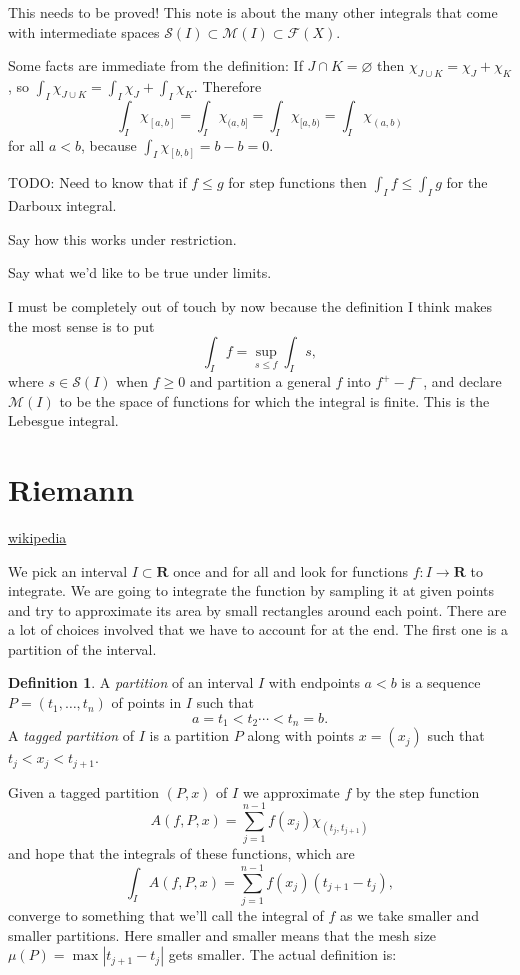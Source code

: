 \documentclass[11pt]{amsart}
\theoremstyle{definition}
\newtheorem{defi}[theo]{Definition}
\newcommand{\cc}[1]{\mathcal{#1}}
\def\empty{\varnothing}
\def\RR{\mathbf{R}}
\begin{document}
This needs to be proved!
This note is about the many other integrals that come with intermediate spaces $\cc S(I) \subset \cc M(I) \subset \cc F(X)$.


Some facts are immediate from the definition:
If $J \cap K = \empty$ then $\chi_{J \cup K} = \chi_J + \chi_K$, so $\int_I \chi_{J \cup K} = \int_I \chi_J + \int_I \chi_K$.
Therefore 
\[
\int_I \chi_{[a,b]} = 
\int_I \chi_{(a,b]} = 
\int_I \chi_{[a,b)} = 
\int_I \chi_{(a,b)}
\]
for all $a < b$, because $\int_{I} \chi_{[b,b]} = b - b = 0$.

TODO: Need to know that if $f \leq g$ for step functions then $\int_I f \leq \int_I g$ for the Darboux integral.

Say how this works under restriction.

Say what we'd like to be true under limits.

I must be completely out of touch by now because the definition I think makes the most sense is to put
\[
\int_I f
= \sup_{s \leq f} \int_I s,
\]
where $s \in \cc S(I)$ when $f \geq 0$ and partition a general $f$ into $f^+ - f^-$, and declare $\cc M(I)$ to be the space of functions for which the integral is finite.
This is the Lebesgue integral.


\section{Riemann}

\href{https://en.wikipedia.org/wiki/Riemann_integral}{wikipedia}


We pick an interval $I \subset \RR$ once and for all and look for functions $f : I \to \RR$ to integrate.
We are going to integrate the function by sampling it at given points and try to approximate its area by small rectangles around each point.
There are a lot of choices involved that we have to account for at the end.
The first one is a partition of the interval.

\begin{defi}
A \emph{partition} of an interval $I$ with endpoints $a < b$ is a sequence $P = (t_1, \ldots, t_n)$ of points in $I$ such that
\[
a = t_1 < t_2 \cdots < t_n = b.
\]
A \emph{tagged partition} of $I$ is a partition $P$ along with points $x = (x_j)$ such that $t_j < x_j < t_{j+1}$.
\end{defi}

Given a tagged partition $(P,x)$ of $I$ we approximate $f$ by the step function
\[
A(f, P, x) = \sum_{j=1}^{n-1} f(x_j) \chi_{(t_j, t_{j+1})}
\]
and hope that the integrals of these functions, which are
\[
\int_I A(f,P,x) = \sum_{j=1}^{n-1} f(x_j) (t_{j+1} - t_j),
\]
converge to something that we'll call the integral of $f$ as we take smaller and smaller partitions.
Here smaller and smaller means that the mesh size $\mu(P) = \max |t_{j+1}-t_j|$ gets smaller.
The actual definition is:
\end{document}
